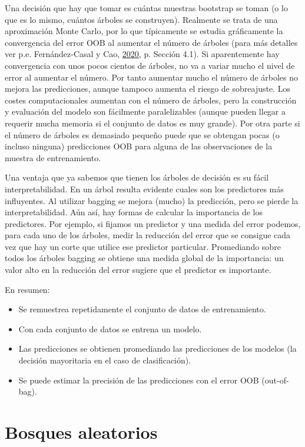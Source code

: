 \documentclass[
  spanish,
]{book}
\theoremstyle{break}
\theoremstyle{definition}
\theoremstyle{definition}
\theoremstyle{definition}
\theoremstyle{remark}
\begin{document}
Una decisión que hay que tomar es cuántas muestras bootstrap se toman (o lo que es lo mismo, cuántos árboles se construyen).
Realmente se trata de una aproximación Monte Carlo, por lo que típicamente se estudia gráficamente la convergencia del error OOB al aumentar el número de árboles (para más detalles ver p.e. Fernández-Casal y Cao, \protect\hyperlink{ref-fernandez2020simbook}{2020}, p. Sección 4.1).
Si aparentemente hay convergencia con unos pocos cientos de árboles, no va a variar mucho el nivel de error al aumentar el número.
Por tanto aumentar mucho el número de árboles no mejora las predicciones, aunque tampoco aumenta el riesgo de sobreajuste.
Los costes computacionales aumentan con el número de árboles, pero la construcción y evaluación del modelo son fácilmente paralelizables (aunque pueden llegar a requerir mucha memoria si el conjunto de datos es muy grande).
Por otra parte si el número de árboles es demasiado pequeño puede que se obtengan pocas (o incluso ninguna) predicciones OOB para alguna de las observaciones de la muestra de entrenamiento.

Una ventaja que ya sabemos que tienen los árboles de decisión es su fácil interpretabilidad.
En un árbol resulta evidente cuales son los predictores más influyentes.
Al utilizar bagging se mejora (mucho) la predicción, pero se pierde la interpretabilidad.
Aún así, hay formas de calcular la importancia de los predictores.
Por ejemplo, si fijamos un predictor y una medida del error podemos, para cada uno de los árboles, medir la reducción del error que se consigue cada vez que hay un corte que utilice ese predictor particular.
Promediando sobre todos los árboles bagging se obtiene una medida global de la importancia: un valor alto en la reducción del error sugiere que el predictor es importante.

En resumen:

\begin{itemize}
\item
  Se remuestrea repetidamente el conjunto de datos de entrenamiento.
\item
  Con cada conjunto de datos se entrena un modelo.
\item
  Las predicciones se obtienen promediando las predicciones de los
  modelos (la decisión mayoritaria en el caso de clasificación).
\item
  Se puede estimar la precisión de las predicciones con el error OOB (out-of-bag).
\end{itemize}

\hypertarget{bosques-aleatorios}{%
\section{Bosques aleatorios}\label{bosques-aleatorios}}
\end{document}
